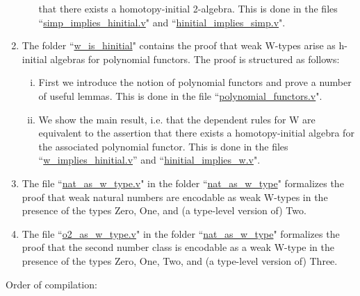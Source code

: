 \documentclass{article}
\theoremstyle{remark}
\theoremstyle{definition}
\begin{document}
\begin{enumerate}[1)]
\begin{enumerate}[i)]
that there exists a homotopy-initial 2-algebra. This is done in the files
``\url{simp_implies_hinitial.v}" and ``\url{hinitial_implies_simp.v}".
\end{enumerate}
\item The folder ``\url{w_is_hinitial}" contains the proof that weak W-types arise as h-initial
   algebras for polynomial functors. The proof is structured as follows:
         \begin{enumerate}[i)]
         \item  First we introduce the notion of polynomial functors and prove a number
of useful lemmas. This is done in the file ``\url{polynomial_functors.v}".
         \item We show the main result, i.e. that the dependent rules for W are
              equivalent to the assertion that there exists a homotopy-initial algebra
              for the associated polynomial functor. This is done in the files
              ``\url{w_implies_hinitial.v}'' and ``\url{hinitial_implies_w.v}".
\end{enumerate}
\item The file ``\url{nat_as_w_type.v}" in the folder ``\url{nat_as_w_type}" formalizes the proof that
   weak natural numbers are encodable as weak W-types in the presence of the types
   Zero, One, and (a type-level version of) Two.
   \item  The file ``\url{o2_as_w_type.v}" in the folder ``\url{nat_as_w_type}" formalizes the proof that the
   second number class is encodable as a weak W-type in the presence of the types
   Zero, One, Two, and (a type-level version of) Three.
\end{enumerate}

\medskip

\noindent
Order of compilation:
\end{document}
